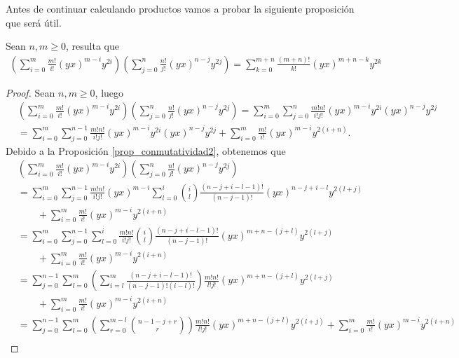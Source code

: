 \documentclass[fleqn,../tesis.tex]{subfiles}
\begin{document}
Antes de continuar calculando productos vamos a probar la siguiente proposición que
será útil.
\begin{prop}
	Sean $n, m \geq 0$, resulta que
	\begin{align*}
		\left(\sum_{i = 0}^{m}\frac{m!}{i!}(yx)^{m - i}y^{2i}\right)
			\left(\sum_{j = 0}^{n}\frac{n!}{j!}(yx)^{n - j}y^{2j}\right)
			= \sum_{k = 0}^{m + n}\frac{(m + n)!}{k!}(yx)^{m + n - k}y^{2k}
	\end{align*}
\end{prop}
\begin{proof}
	Sean $n ,m \geq 0$, luego
	\begin{align*}
		&\left(\sum_{i = 0}^{m}\frac{m!}{i!}(yx)^{m - i}y^{2i}\right)
			\left(\sum_{j = 0}^{n}\frac{n!}{j!}(yx)^{n - j}y^{2j}\right)
			= \sum_{i = 0}^{m}\sum_{j = 0}^{n}\frac{m!n!}{i!j!}(yx)^{m - i}y^{2i}(yx)^{n - j}y^{2j}\\
		&=\sum_{i = 0}^{m}\sum_{j = 0}^{n - 1}\frac{m!n!}{i!j!}(yx)^{m - i}y^{2i}(yx)^{n - j}y^{2j}
			+\sum_{i = 0}^{m}\frac{m!}{i!}(yx)^{m - i}y^{2(i + n)}.
	\end{align*}
	Debido a la Proposición \ref{prop_conmutatividad2}, obtenemos que
	\begin{align*}
		&\left(\sum_{i = 0}^{m}\frac{m!}{i!}(yx)^{m - i}y^{2i}\right)
			\left(\sum_{j = 0}^{n}\frac{n!}{j!}(yx)^{n - j}y^{2j}\right)\\
		&=\sum_{i = 0}^{m}\sum_{j = 0}^{n - 1}\frac{m!n!}{i!j!}(yx)^{m - i}
			\sum_{l = 0}^{i}\binom{i}{l}\frac{(n - j + i - l - 1)!}{(n -j - 1)!}(yx)^{n - j + i - l}y^{2(l + j)}\\
		&\qquad + \sum_{i = 0}^{m}\frac{m!}{i!}(yx)^{m - i}y^{2(i + n)}\\
		&=\sum_{i = 0}^{m}\sum_{j = 0}^{n - 1}\sum_{l = 0}^{i}\frac{m!n!}{i!j!}
			\binom{i}{l}\frac{(n - j + i - l - 1)!}{(n -j - 1)!}(yx)^{m + n - (j + l)}y^{2(l + j)}\\
		&\qquad + \sum_{i = 0}^{m}\frac{m!}{i!}(yx)^{m - i}y^{2(i + n)}\\
		&=\sum_{j = 0}^{n - 1}\sum_{l = 0}^{m}
			\left(\sum_{i = l}^{m}\frac{(n - j + i - l - 1)!}{(n -j - 1)!(i - l)!}\right)\frac{m!n!}{l!j!}
			(yx)^{m + n - (j + l)}y^{2(l + j)}\\
		&\qquad + \sum_{i = 0}^{m}\frac{m!}{i!}(yx)^{m - i}y^{2(i + n)}\\
		&=\sum_{j = 0}^{n - 1}\sum_{l = 0}^{m}
			\left(\sum_{r = 0}^{m - l}\binom{n - 1 - j + r}{r}\right)\frac{m!n!}{l!j!}
			(yx)^{m + n - (j + l)}y^{2(l + j)}
		 + \sum_{i = 0}^{m}\frac{m!}{i!}(yx)^{m - i}y^{2(i + n)}\\

\end{align*}
\end{proof}
\end{document}
